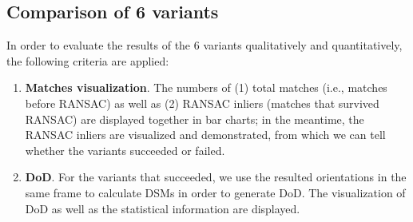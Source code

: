 \subsection{Comparison of 6 variants}
\label{Comparisonof6variants}
In order to evaluate the results of the 6 variants qualitatively and quantitatively, the following criteria are applied:\\
\begin{enumerate}
    \item \textbf{Matches visualization}. The numbers of (1) total matches (i.e., matches before RANSAC) as well as (2) RANSAC inliers (matches that survived RANSAC) are displayed together in bar charts; in the meantime, the RANSAC inliers are visualized and demonstrated, from which we can tell whether the variants succeeded or failed.
    \item \textbf{\ac{DoD}}. For the variants that succeeded, we use the resulted orientations in the same frame to calculate \ac{DSM}s in order to generate \ac{DoD}. The visualization of \ac{DoD} as well as the statistical information are displayed.
\end{enumerate}

